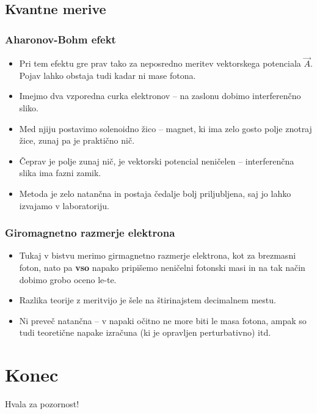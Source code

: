 \documentclass{beamer}
\begin{document}
\subsection{Kvantne merive}

\begin{frame}[t]
	\frametitle{Aharonov-Bohm efekt}
	\begin{itemize}
		\item{Pri tem efektu gre prav tako za neposredno meritev vektorskega potenciala $\vec{A}$. Pojav lahko obstaja tudi kadar ni mase fotona.}
		\item{Imejmo dva vzporedna curka elektronov -- na zaslonu dobimo interferenčno sliko.}
		\item{Med njiju postavimo solenoidno žico -- magnet, ki ima zelo gosto polje znotraj žice, zunaj pa je praktično nič.}
		\item{Čeprav je polje zunaj nič, je vektorski potencial neničelen -- interferenčna slika ima fazni zamik.}
		\item{Metoda je zelo natančna in postaja čedalje bolj priljubljena, saj jo lahko izvajamo v laboratoriju.}
	\end{itemize}
\end{frame}

\begin{frame}[t]
	\frametitle{Giromagnetno razmerje elektrona}
	\begin{itemize}
		\item{Tukaj v bistvu merimo girmagnetno razmerje elektrona, kot za brezmasni foton, nato pa {\bf vso} napako pripišemo neničelni fotonski masi in na tak način
			dobimo grobo oceno le-te.}
		\item{Razlika teorije z meritvijo je šele na štirinajstem decimalnem mestu.}
		\item{Ni preveč natančna -- v napaki očitno ne more biti le masa fotona, ampak so tudi teoretične napake izračuna (ki je opravljen perturbativno) itd.}
	\end{itemize}
\end{frame}

\section{Konec}
\begin{frame}[c]
	\begin{center}
		Hvala za pozornost!
	\end{center}
\end{frame}
\end{document}
